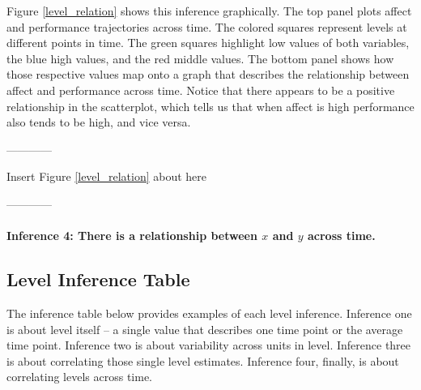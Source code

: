 \documentclass[english,,man]{apa6}
\let\oldparagraph\paragraph
\renewcommand{\paragraph}[1]{\oldparagraph{#1}\mbox{}}
\theoremstyle{definition}
\theoremstyle{definition}
\theoremstyle{definition}
\theoremstyle{remark}
\begin{document}
Figure \ref{level_relation} shows this inference graphically. The top
panel plots affect and performance trajectories across time. The colored
squares represent levels at different points in time. The green squares
highlight low values of both variables, the blue high values, and the
red middle values. The bottom panel shows how those respective values
map onto a graph that describes the relationship between affect and
performance across time. Notice that there appears to be a positive
relationship in the scatterplot, which tells us that when affect is high
performance also tends to be high, and vice versa.

\begin{center}

------------

Insert Figure \ref{level_relation} about here

------------

\end{center}

\hypertarget{inference-4-there-is-a-relationship-between-x-and-y-across-time.}{%
\paragraph{\texorpdfstring{Inference 4: There is a relationship between
\(x\) and \(y\) across
time.}{Inference 4: There is a relationship between x and y across time.}}\label{inference-4-there-is-a-relationship-between-x-and-y-across-time.}}

\hypertarget{level-inference-table}{%
\subsection{Level Inference Table}\label{level-inference-table}}

The inference table below provides examples of each level inference.
Inference one is about level itself -- a single value that describes one
time point or the average time point. Inference two is about variability
across units in level. Inference three is about correlating those single
level estimates. Inference four, finally, is about correlating levels
across time.
\end{document}
